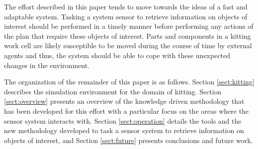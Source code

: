 The effort described in this paper tends to move towards the ideas of a fast and adaptable system. Tasking a system sensor to retrieve information on objects of interest should be performed in a timely manner before performing any actions of the plan that require these objects of interest. Parts and components in a kitting work cell are likely susceptible to be moved during the course of time by external agents and thus, the system should be able to cope with these unexpected changes in the environment.

The organization of the remainder of this paper is as follows. Section \ref{sect:kitting} describes the simulation environment for the domain of kitting. Section \ref{sect:overview} presents an overview of the knowledge driven methodology that has been developed for this effort with a particular focus on the areas where the sensor system interacts with. Section \ref{sect:operation} details the tools and the new methodology developed to task a sensor system to retrieve information on objects of interest, and Section \ref{sect:future} presents conclusions and future work.



